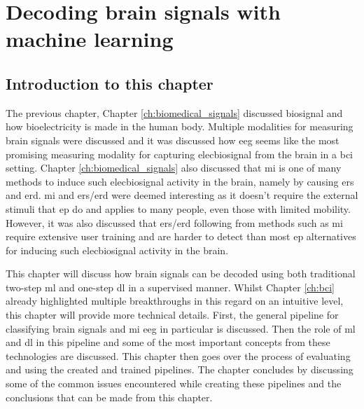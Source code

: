 

\glsresetall

\chapter{Decoding brain signals with machine learning}
\label{ch:processing_signals}

\section{Introduction to this chapter}
\label{sec:processing_signals_introduction}

The previous chapter, Chapter \ref{ch:biomedical_signals} discussed \gls{biosignal} and how bioelectricity is made in the human body.
Multiple modalities for measuring brain signals were discussed and it was discussed how \gls{eeg} seems like the most promising measuring modality for capturing \gls{elecbiosignal} from the brain in a \gls{bci} setting.
Chapter \ref{ch:biomedical_signals} also discussed that \gls{mi} is one of many methods to induce such \gls{elecbiosignal} activity in the brain, namely by causing \gls{ers} and \gls{erd}.
\gls{mi} and \gls{ers}/\gls{erd} were deemed interesting as it doesn't require the external stimuli that \gls{ep} do and applies to many people, even those with limited mobility.
However, it was also discussed that \gls{ers}/\gls{erd} following from methods such as \gls{mi} require extensive user training and are harder to detect than most \gls{ep} alternatives for inducing such \gls{elecbiosignal} activity in the brain.

This chapter will discuss how brain signals can be decoded using both traditional two-step \gls{ml} and one-step \gls{dl} in a supervised manner.
Whilst Chapter \ref{ch:bci} already highlighted multiple breakthroughs in this regard on an intuitive level, this chapter will provide more technical details.
First, the general pipeline for classifying brain signals and \gls{mi} \gls{eeg} in particular is discussed.
Then the role of \gls{ml} and \gls{dl} in this pipeline and some of the most important concepts from these technologies are discussed.
This chapter then goes over the process of evaluating and using the created and trained pipelines.
The chapter concludes by discussing some of the common issues encountered while creating these pipelines and the conclusions that can be made from this chapter.


